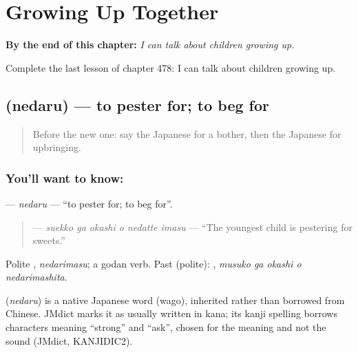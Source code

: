 
\chapter{Growing Up Together}
\label{ch:ja-growing-up-together}

\begin{chapteropening}
\textbf{By the end of this chapter:} \emph{I can talk about children growing up.}

Complete the last lesson of chapter 478: I can talk about children growing up.
\end{chapteropening}

\section[\texorpdfstring{\ja{ねだる} (nedaru)}{ねだる (nedaru)}]{ (nedaru) — to pester for; to beg for}

\label{lesson:JA-C478-nedaru}



\begin{quote}
Before the new one: say the Japanese for a bother, then the Japanese for upbringing.
\end{quote}

\subsection*{You'll want to know: }
\textbf{} — \emph{nedaru} — \textquotedblleft{}to pester for; to beg for\textquotedblright{}.

\begin{quote}
\textbf{  } — \emph{suekko ga okashi o nedatte imasu} — \textquotedblleft{}The youngest child is pestering for sweets.\textquotedblright{}
\end{quote}

Polite \textbf{}, \emph{nedarimasu}; a godan verb. Past (polite): \textbf{  }, \emph{musuko ga okashi o nedarimashita}.

\begin{cousinweb}
\textbf{} (\emph{nedaru}) is a native Japanese word (wago), inherited rather than borrowed from Chinese. JMdict marks it as usually written in kana; its kanji spelling borrows characters meaning \textquotedblleft{}strong\textquotedblright{} and \textquotedblleft{}ask\textquotedblright{}, chosen for the meaning and not the sound (JMdict, KANJIDIC2).
\end{cousinweb}

